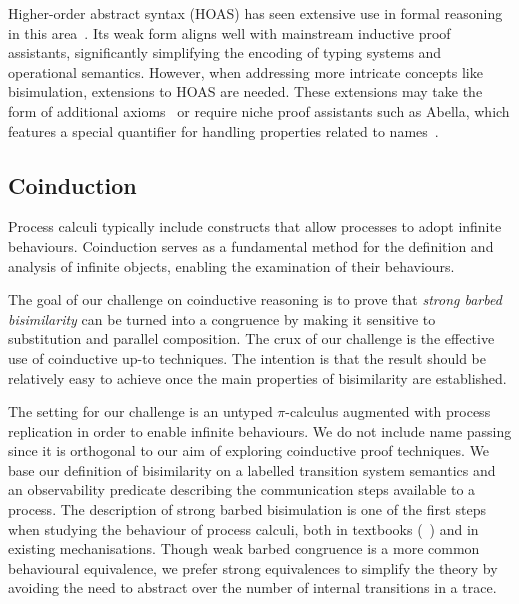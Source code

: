 \documentclass[runningheads]{llncs}
\begin{document}
Higher-order abstract syntax (HOAS) has seen extensive
use in formal reasoning in this area~\cite{Despeyroux2000,Honsell2001,Tiu2010,ChaudhuriCM15,Castro-Perez2021}. Its
weak form aligns well with mainstream inductive proof assistants,
significantly simplifying the encoding of typing systems and operational
semantics. However, when addressing more intricate concepts like
bisimulation, extensions to HOAS are needed. These extensions may take
the form of additional axioms~\cite{Honsell2001} or require niche proof assistants
such as Abella, which features a special quantifier for handling
properties related to names~\cite{GacekMN11}.

\subsection{Coinduction}

Process calculi typically include constructs that allow processes to
adopt infinite behaviours.  Coinduction serves as a fundamental method
for the definition and analysis of infinite objects, enabling the
examination of their behaviours.

The goal of our challenge on coinductive reasoning is to prove that
\emph{strong barbed bisimilarity} can be turned into a congruence by
making it sensitive to substitution and parallel composition. The crux
of our challenge is the effective use of coinductive up-to techniques.
The intention is that the result should be relatively easy to
achieve once the main properties of bisimilarity are established.

The setting for our challenge is an untyped \(\pi\)-calculus augmented
with process replication in order to enable infinite behaviours.  We
do not include name passing since it is orthogonal to our aim of
exploring coinductive proof techniques.  We base our definition of
bisimilarity on a labelled transition system semantics and an
observability predicate describing the communication steps available
to a process.  The description of strong barbed bisimulation is one of
the first steps when studying the behaviour of process calculi, both
in textbooks (\eg~\cite{picalcbook}) and in existing mechanisations.
Though weak barbed congruence is a more common behavioural
equivalence, we prefer strong equivalences to simplify the theory by
avoiding the need to abstract over the number of internal transitions
in a trace.
\end{document}
